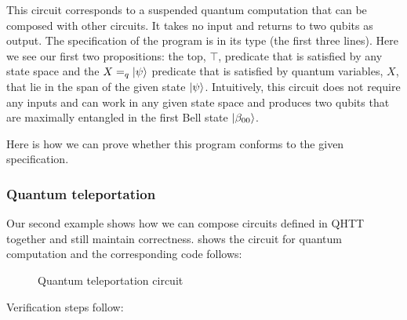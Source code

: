 \documentclass[adraft,creativecommons]{eptcs}
\begin{document}
This circuit corresponds to a suspended quantum computation that can be composed with other circuits. It takes no input and returns to two qubits as output. The specification of the program is in its type (the first three lines). Here we see our first two propositions: the top, $\top$, predicate that is satisfied by any state space and the $X =_q \ket{\psi}$ predicate that is satisfied by quantum variables, $X$, that lie in the span of the given state $\ket{\psi}$. Intuitively, this circuit does not require any inputs and can work in any given state space and produces two qubits that are maximally entangled in the first Bell state $\ket{\beta_{00}}$.

Here is how we can prove whether this program conforms to the given specification.



\subsubsection{Quantum teleportation}
\label{sec:teleport}
Our second example shows how we can compose circuits defined in QHTT together and still maintain correctness.  shows the circuit for quantum computation and the corresponding code follows:

\begin{figure}
    \centering
    \caption{Quantum teleportation circuit}
    \label{fig:teleport}
\end{figure}



Verification steps follow:
\end{document}
